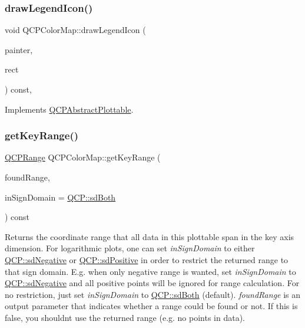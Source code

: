 \subsubsection{\texorpdfstring{draw\+Legend\+Icon()}{drawLegendIcon()}}
{\footnotesize\ttfamily void Q\+C\+P\+Color\+Map\+::draw\+Legend\+Icon (\begin{DoxyParamCaption}\item[{\hyperlink{class_q_c_p_painter}{Q\+C\+P\+Painter} $\ast$}]{painter,  }\item[{const Q\+RectF \&}]{rect }\end{DoxyParamCaption}) const\hspace{0.3cm}{\ttfamily [protected]}, {\ttfamily [virtual]}}



Implements \hyperlink{class_q_c_p_abstract_plottable_a9a450783fd9ed539e589999fd390cdf7}{Q\+C\+P\+Abstract\+Plottable}.

\mbox{\label{class_q_c_p_color_map_a985861974560f950af6cb7fae8c46267}} 
\subsubsection{\texorpdfstring{get\+Key\+Range()}{getKeyRange()}}
{\footnotesize\ttfamily \hyperlink{class_q_c_p_range}{Q\+C\+P\+Range} Q\+C\+P\+Color\+Map\+::get\+Key\+Range (\begin{DoxyParamCaption}\item[{bool \&}]{found\+Range,  }\item[{\hyperlink{namespace_q_c_p_afd50e7cf431af385614987d8553ff8a9}{Q\+C\+P\+::\+Sign\+Domain}}]{in\+Sign\+Domain = {\ttfamily \hyperlink{namespace_q_c_p_afd50e7cf431af385614987d8553ff8a9aa38352ef02d51ddfa4399d9551566e24}{Q\+C\+P\+::sd\+Both}} }\end{DoxyParamCaption}) const\hspace{0.3cm}{\ttfamily [virtual]}}

Returns the coordinate range that all data in this plottable span in the key axis dimension. For logarithmic plots, one can set {\itshape in\+Sign\+Domain} to either \hyperlink{namespace_q_c_p_afd50e7cf431af385614987d8553ff8a9a2d18af0bc58f6528d1e82ce699fe4829}{Q\+C\+P\+::sd\+Negative} or \hyperlink{namespace_q_c_p_afd50e7cf431af385614987d8553ff8a9a584784b75fb816abcc627cf743bb699f}{Q\+C\+P\+::sd\+Positive} in order to restrict the returned range to that sign domain. E.\+g. when only negative range is wanted, set {\itshape in\+Sign\+Domain} to \hyperlink{namespace_q_c_p_afd50e7cf431af385614987d8553ff8a9a2d18af0bc58f6528d1e82ce699fe4829}{Q\+C\+P\+::sd\+Negative} and all positive points will be ignored for range calculation. For no restriction, just set {\itshape in\+Sign\+Domain} to \hyperlink{namespace_q_c_p_afd50e7cf431af385614987d8553ff8a9aa38352ef02d51ddfa4399d9551566e24}{Q\+C\+P\+::sd\+Both} (default). {\itshape found\+Range} is an output parameter that indicates whether a range could be found or not. If this is false, you shouldn\textquotesingle{}t use the returned range (e.\+g. no points in data).


